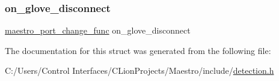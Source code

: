 \subsubsection{\texorpdfstring{on\+\_\+glove\+\_\+disconnect}{on\_glove\_disconnect}}
{\footnotesize\ttfamily \hyperlink{detection_8h_a97acba48581134d2db93ead25c0e8c32}{maestro\+\_\+port\+\_\+change\+\_\+func} on\+\_\+glove\+\_\+disconnect}



The documentation for this struct was generated from the following file\+:\begin{DoxyCompactItemize}
\item 
C\+:/\+Users/\+Control Interfaces/\+C\+Lion\+Projects/\+Maestro/include/\hyperlink{detection_8h}{detection.\+h}\end{DoxyCompactItemize}
